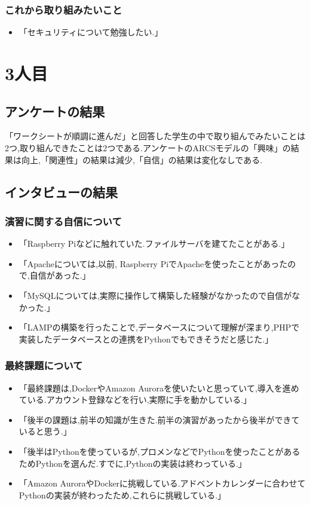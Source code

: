 \documentclass[11pt, a4paper]{jreport}
\begin{document}
\subsubsection{これから取り組みたいこと}

\begin{itemize}
\item 「セキュリティについて勉強したい.」
\end{itemize}


\section{3人目}

\subsection{アンケートの結果}

「ワークシートが順調に進んだ」と回答した学生の中で取り組んでみたいことは2つ,取り組んできたことは2つである.アンケートのARCSモデルの「興味」の結果は向上,「関連性」の結果は減少,「自信」の結果は変化なしである.

\subsection{インタビューの結果}

\subsubsection{演習に関する自信について}

\begin{itemize}
\item 「Raspberry Piなどに触れていた.ファイルサーバを建てたことがある.」
\item 「Apacheについては,以前, Raspberry PiでApacheを使ったことがあったので,自信があった.」
\item 「MySQLについては,実際に操作して構築した経験がなかったので自信がなかった.」
\item 「LAMPの構築を行ったことで,データベースについて理解が深まり,PHPで実装したデータベースとの連携をPythonでもできそうだと感じた.」
\end{itemize}

\subsubsection{最終課題について}

\begin{itemize}
\item 「最終課題は,DockerやAmazon Auroraを使いたいと思っていて,導入を進めている.アカウント登録などを行い,実際に手を動かしている.」
\item 「後半の課題は,前半の知識が生きた.前半の演習があったから後半ができていると思う.」
\item 「後半はPythonを使っているが,プロメンなどでPythonを使ったことがあるためPythonを選んだ.すでに,Pythonの実装は終わっている.」
\item 「Amazon AuroraやDockerに挑戦している.アドベントカレンダーに合わせてPythonの実装が終わったため,これらに挑戦している.」
\end{itemize}
\end{document}

